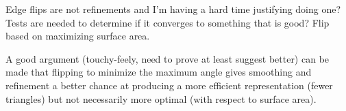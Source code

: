Edge flips are not refinements and I’m having a hard time justifying doing one? Tests are needed to determine if it converges to something that is good? Flip based on maximizing surface area.

A good argument (touchy-feely, need to prove at least suggest better) can be made that flipping to minimize the maximum angle gives smoothing and refinement a better chance at producing a more efficient representation (fewer triangles) but not necessarily more optimal (with respect to surface area).

